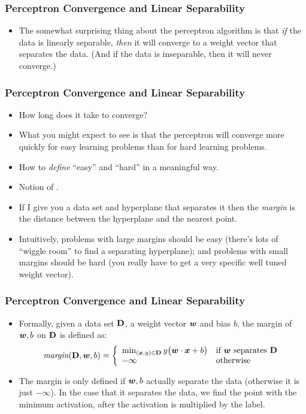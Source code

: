 \documentclass[trans]{beamer}
\begin{document}
\begin{frame}
  \frametitle{Perceptron Convergence and Linear Separability}
\begin{itemize}
\item
The somewhat surprising thing about the perceptron algorithm is that
\emph{if} the data is linearly separable, \emph{then} it will converge
to a weight vector that separates the data.  (And if the data is
inseparable, then it will never converge.)  
\end{itemize}
\end{frame}
\begin{frame}
  \frametitle{Perceptron Convergence and Linear Separability}
\begin{itemize}
\item
How long does it take to converge?  
\item 
What you might expect to see is that the perceptron will converge more
quickly for easy learning problems than for hard learning problems.
\item How to \emph{define}
``easy'' and ``hard'' in a meaningful way.  
\item Notion of .
\item 
  If I give you a
data set and hyperplane that separates it  then the \emph{margin} is the distance
between the hyperplane and the nearest point.
\item   Intuitively, problems
with large margins should be easy (there's lots of ``wiggle room'' to
find a separating hyperplane); and problems with small margins should
be hard (you really have to get a very specific well tuned weight
vector).
\end{itemize}
\end{frame}
\begin{frame}
  \frametitle{Perceptron Convergence and Linear Separability}
\begin{itemize}
\item
Formally, given a data set $\text{\bf D}$, a weight vector ${\boldsymbol{w}}$ and bias
$b$, the margin of ${\boldsymbol{w}},b$ on $\text{\bf D}$ is defined as:
\begin{equation} \label{eq:margin}
\textit{margin}(\text{\bf D}, {\boldsymbol{w}}, b)
= \left\{\begin{array}{ll}
     \min_{({\boldsymbol{x}},y) \in \text{\bf D}} y \big( {\boldsymbol{w}} \cdot {\boldsymbol{x}} + b \big)
      & \text{if ${\boldsymbol{w}}$ separates $\text{\bf D}$} \\
    -\infty & \text{otherwise}
\end{array}\right.
\end{equation}
\item The margin is only defined if ${\boldsymbol{w}},b$ actually separate the
data (otherwise it is just $-\infty$).  In the case that it separates
the data, we find the point with the minimum activation, after the
activation is multiplied by the label.
\end{itemize}
\end{frame}
\end{document}
